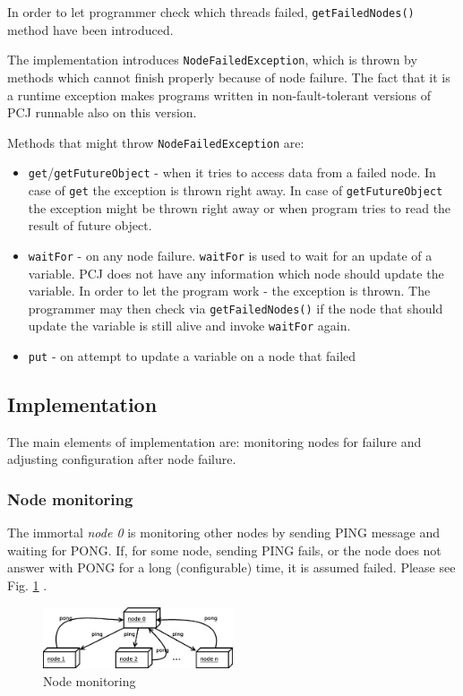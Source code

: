 \documentclass{llncs}
\newcommand{\inlinecode}{\texttt}
\begin{document}
In order to let programmer check which threads failed, \inlinecode{getFailedNodes()} method have been introduced.

The implementation introduces \inlinecode{NodeFailedException}, which is thrown by methods which cannot finish properly because of node failure.
The fact that it is a runtime exception makes programs written in non-fault-tolerant versions of PCJ runnable also on this version.

Methods that might throw \inlinecode{NodeFailedException} are:
\vspace{-2mm}
\begin{itemize}
\item \inlinecode{get}/\inlinecode{getFutureObject} - when it tries to access data from a failed node.
In case of \inlinecode{get} the exception is thrown right away.
In case of \inlinecode{getFutureObject} the exception might be thrown right away or when program tries to read the result of future object.
\item \inlinecode{waitFor} - on any node failure. \inlinecode{waitFor} is used to wait for an update of a variable. PCJ does not have any information which node should update the variable.
 In order to let the program work - the exception is thrown.
 The programmer may then check via \inlinecode{getFailedNodes()} if the node that should update the variable is still alive and invoke \inlinecode{waitFor} again. %
\item \inlinecode{put} - on attempt to update a variable on a node that failed
\end{itemize}


\subsection{Implementation}

The main elements of implementation are: monitoring nodes for failure and adjusting configuration after node failure.

\subsubsection{Node monitoring}
The immortal \emph{node 0} is monitoring other nodes by sending PING message and waiting for PONG.
If, for some node, sending PING fails, or the node does not answer with PONG for a long (configurable) time,
it is assumed failed. Please see Fig. \ref{pinging} .

\begin{figure}
  \centering
      \includegraphics[width=0.5\textwidth]{node-monitoring.eps}
  \caption{Node monitoring}
  \label{pinging}
\end{figure}
\end{document}
